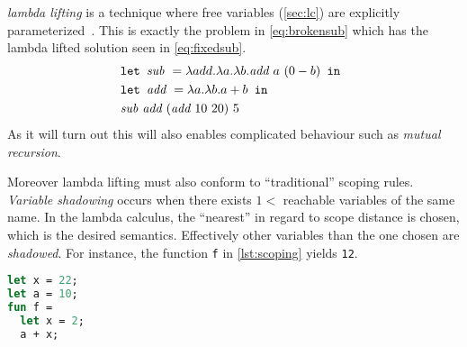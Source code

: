 \textit{lambda lifting} is a technique where free variables (\autoref{sec:lc}) are explicitly parameterized~\cite{johnsson1985lambda}.
This is exactly the problem in \autoref{eq:brokensub} which has the lambda lifted solution seen in \autoref{eq:fixedsub}.
\begin{align}
  &\texttt{let } \textit{sub } = \lambda add.\lambda a.\lambda b.\textit{add } a \,\,(0 - b) \texttt{ in } \label{eq:fixedsub}\\&\texttt{let } \textit{add } = \lambda a.\lambda b.a+b \texttt{ in } \tag*{}\\&\textit{sub } \textit{add } (\textit{add } 10 \,\, 20) \,\, 5\tag*{}
\end{align}
As it will turn out this will also enables complicated behaviour such as \textit{mutual recursion}.

Moreover lambda lifting must also conform to ``traditional'' scoping rules.
\textit{Variable shadowing} occurs when there exists $1 < $ reachable variables of the same name.
In the lambda calculus, the ``nearest'' in regard to scope distance is chosen, which is the desired semantics.
Effectively other variables than the one chosen are \textit{shadowed}.
For instance, the function \texttt{f} in \autoref{lst:scoping} yields \texttt{12}.
\begin{lstlisting}[language=ML,caption={Scoping rules in programming languages},label={lst:scoping}]
let x = 22;
let a = 10;
fun f = 
  let x = 2;
  a + x;
\end{lstlisting}

